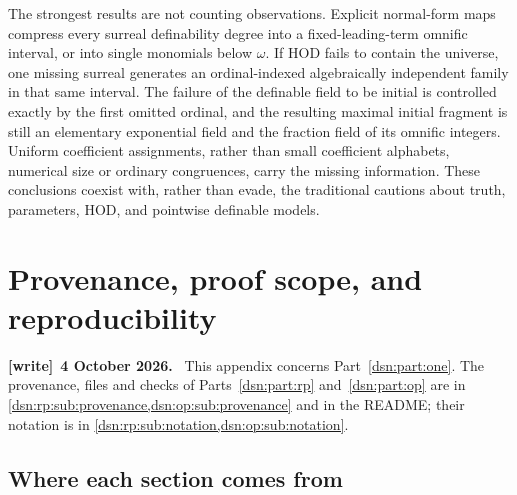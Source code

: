 \documentclass[11pt,a4paper]{article}
\numberwithin{equation}{section}
\theoremstyle{definition}
\theoremstyle{remark}
\newcommand{\HOD}{\mathrm{HOD}}
\newenvironment{writenote}[1][]{\par\medskip\begingroup\small\noindent\textbf{[write]}\if\relax\detokenize{#1}\relax\else~\textbf{#1.}\fi~\ignorespaces}{\par\endgroup\medskip}
\begin{document}
The strongest results are not counting observations. Explicit normal-form
maps compress every surreal definability degree into a fixed-leading-term
omnific interval, or into single monomials below $\omega$. If $\HOD$ fails
to contain the universe, one missing surreal generates an ordinal-indexed
algebraically independent family in that same interval. The failure of the
definable field to be initial is controlled exactly by the first omitted
ordinal, and the resulting maximal initial fragment is still an elementary
exponential field and the fraction field of its omnific integers. Uniform
coefficient assignments, rather than small coefficient alphabets, numerical
size or ordinary congruences, carry the missing information. These
conclusions coexist with, rather than evade, the traditional cautions about
truth, parameters, $\HOD$, and pointwise definable models.

\appendix
{}
\section{Provenance, proof scope, and reproducibility}
\label{dsn:app:provenance}

\begin{writenote}[4 October 2026]
This appendix concerns Part~\ref{dsn:part:one}. The provenance, files and
checks of Parts~\ref{dsn:part:rp} and~\ref{dsn:part:op} are in
\cref{dsn:rp:sub:provenance,dsn:op:sub:provenance} and in the README; their
notation is in \cref{dsn:rp:sub:notation,dsn:op:sub:notation}.
\end{writenote}

\subsection{Where each section comes from}
\end{document}
